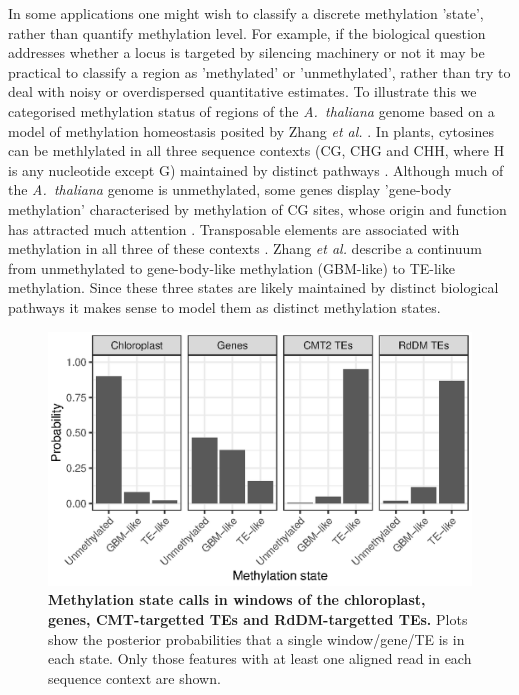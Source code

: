 \documentclass[10pt,letterpaper]{article}
\begin{document}
In some applications one might wish to classify a discrete methylation 'state', rather than quantify methylation level.
For example, if the biological question addresses whether a locus is targeted by silencing machinery or not it may be practical to classify a region as 'methylated' or 'unmethylated', rather than try to deal with noisy or overdispersed quantitative estimates.
To illustrate this we categorised methylation status of regions of the \emph{A.~thaliana} genome based on a model of methylation homeostasis posited by Zhang \textit{et al.} \cite{zhang2020natural}.
In plants, cytosines can be methlylated in all three sequence contexts (CG, CHG and CHH, where H is any nucleotide except G) maintained by distinct pathways \cite{law2010establishing}.
Although much of the \emph{A.~thaliana} genome is unmethylated, some genes display 'gene-body methylation' characterised by methylation of CG sites, whose origin and function has attracted much attention \cite{muyle2022gene}. 
Transposable elements are associated with methylation in all three of these contexts \cite{cokus2008shotgun, lister2008highly}.
Zhang \textit{et al.} \cite{zhang2020natural} describe a continuum from unmethylated to gene-body-like methylation (GBM-like) to TE-like methylation.
Since these three states are likely maintained by distinct biological pathways it makes sense to model them as distinct methylation states.

\begin{figure}
    \centering
    \includegraphics{figure4.eps}
    \caption{
        {\bf Methylation state calls in windows of the chloroplast, genes, CMT-targetted TEs and RdDM-targetted TEs.}
        Plots show the posterior probabilities that a single window/gene/TE is in each state.
        Only those features with at least one aligned read in each sequence context are shown.
    }
    \label{fig:meth-state}
\end{figure}
\end{document}
